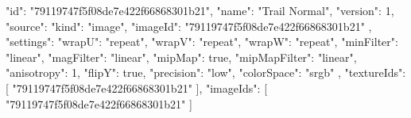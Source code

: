 {
  "id": "79119747f5f08de7e422f66868301b21",
  "name": "Trail Normal",
  "version": 1,
  "source": {
    "kind": "image",
    "imageId": "79119747f5f08de7e422f66868301b21"
  },
  "settings": {
    "wrapU": "repeat",
    "wrapV": "repeat",
    "wrapW": "repeat",
    "minFilter": "linear",
    "magFilter": "linear",
    "mipMap": true,
    "mipMapFilter": "linear",
    "anisotropy": 1,
    "flipY": true,
    "precision": "low",
    "colorSpace": "srgb"
  },
  "textureIds": [
    "79119747f5f08de7e422f66868301b21"
  ],
  "imageIds": [
    "79119747f5f08de7e422f66868301b21"
  ]
}
